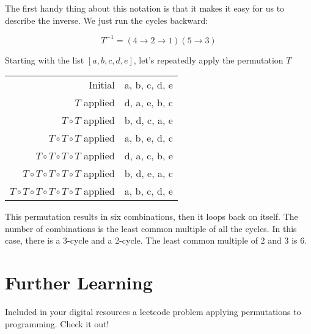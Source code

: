 The first handy thing about this notation is that it makes it easy for
us to describe the inverse. We just run the cycles backward:

$$T^{-1} = (4 \rightarrow 2 \rightarrow 1)(5 \rightarrow 3)$$

Starting with the list $[a, b, c, d, e]$, let's repeatedly apply the permutation $T$

\begin{tabular}{r | l}
  Initial & {\color{red} a, b,} {\color{blue} c,} {\color{red} d,} {\color{blue} e} \\ 
  $T$ applied & {\color{red} d, a,}  {\color{blue} e,} {\color{red} b,} {\color{blue} c}\\
  $T \circ T$ applied & {\color{red} b, d,} {\color{blue} c,} {\color{red} a,}  {\color{blue} e} \\
  $T \circ T \circ T$ applied & {\color{red} a, b,}  {\color{blue} e,} {\color{red} d,} {\color{blue} c} \\
  $T \circ T \circ T \circ T$ applied & {\color{red} d, a,} {\color{blue} c,} {\color{red}b,}  {\color{blue} e} \\
  $T \circ T \circ T \circ T \circ T$ applied & {\color{red} b, d,}  {\color{blue} e,} {\color{red} a,} {\color{blue} c} \\
  $T \circ T \circ T \circ T \circ T \circ T$ applied & {\color{red} a, b,} {\color{blue} c,} {\color{red} d,}  {\color{blue} e}\\
\end{tabular}

This permutation results in six combinations, then it loops back
on itself. The number of combinations is the least common multiple of
all the cycles.  In this case, there is a 3-cycle and a 2-cycle. The
least common multiple of 2 and 3 is 6.

\section{Further Learning}
Included in your digital resources a leetcode problem applying permutations to programming. Check it out!

